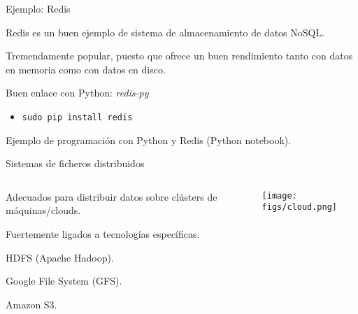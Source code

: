 
\begin{frame}{Ejemplo: Redis}
 \begin{wideitemize}
  \item Redis es un buen ejemplo de sistema de almacenamiento de datos NoSQL.
  
  \item Tremendamente popular, puesto que ofrece un buen rendimiento tanto con
  datos en memoria como con datos en disco.
  
  \item Buen enlace con Python: \textit{redis-py}
  \begin{itemize}
   \item \texttt{sudo pip install redis}
  \end{itemize}

  \item Ejemplo de programación con Python y Redis (Python notebook).
  
 \end{wideitemize}

\end{frame}


\begin{frame}{Sistemas de ficheros distribuidos}
 \begin{columns}[T]
    \begin{column}{.75\textwidth}
     \begin{wideitemize}
      \item Adecuados para distribuir datos sobre clústers de máquinas/clouds.
      \item Fuertemente ligados a tecnologías específicas.
      \item HDFS (Apache Hadoop).
      \item Google File System (GFS).
      \item Amazon S3.
    \end{wideitemize}
    \end{column}
    \begin{column}{.25\textwidth}
    \vspace*{1.5cm}
    \texttt{[image: figs/cloud.png]}
    \end{column}
  \end{columns}
 
\end{frame}
